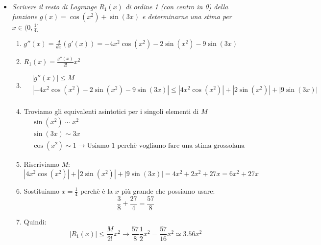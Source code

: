 \documentclass[10pt, a4paper]{article}
\begin{document}
\begin{itemize}
\begin{enumerate}
            \end{enumerate}
            \item \textit{Scrivere il resto di Lagrange $R_1(x)$ di ordine 1 (con centro in 0) della funzione $g(x)=\cos(x^2)+\sin(3x)$ e determinarne una stima per $x\in(0,\frac{1}{4}]$} \begin{enumerate}
                \item $g''(x)=\frac{d}{dx}(g'(x))=-4x^2\cos(x^2)-2\sin(x^2)-9\sin(3x)$
                \item $R_1(x)=\frac{g''(x)}{2!}x^2$
                \item \begin{equation*}
                    \begin{split}
                        &\left|g''(x)\right|\leq M\\
                        &\left|-4x^2\cos(x^2)-2\sin(x^2)-9\sin(3x)\right|\leq \left|4x^2\cos(x^2)\right|+\left|2\sin(x^2)\right|+\left|9\sin(3x)\right|\\
                    \end{split}
                \end{equation*}
                \item Troviamo gli equivalenti asintotici per i singoli elementi di $M$ \begin{equation*}
                    \begin{split}
                        &\sin(x^2)\sim x^2\\
                        &\sin(3x) \sim 3x\\
                        &\cos(x^2) \sim 1 \rightarrow \text{Usiamo 1 perchè vogliamo fare una stima grossolana}
                    \end{split}
                \end{equation*}
                \item Riscriviamo $M$: \begin{equation*}
                    \left|4x^2\cos(x^2)\right|+\left|2\sin(x^2)\right|+\left|9\sin(3x)\right|=4x^2+2x^2+27x=6x^2+27x
                \end{equation*}
                \item Sostituiamo $x=\frac{1}{4}$ perchè è la $x$ più grande che possiamo usare: \begin{equation*}
                    \frac{3}{8}+\frac{27}{4}=\frac{57}{8}
                \end{equation*}
                \item Quindi: \begin{equation*}
                    \left|R_1(x)\right|\leq \frac{M}{2!}x^2\rightarrow\frac{57}{8}\frac{1}{2}x^2=\frac{57}{16}x^2\simeq 3.56x^2
                \end{equation*}
            \end{enumerate}
        \end{itemize}
\end{document}
